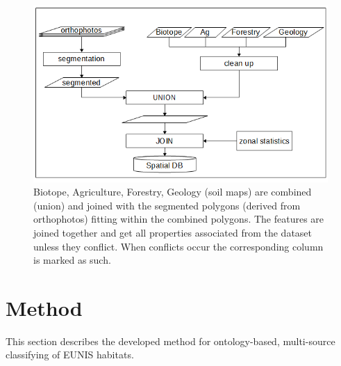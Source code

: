 \documentclass[authoryear, review,12pt,number]{elsarticle}
\begin{document}
\begin{figure} \includegraphics[width=1\textwidth]{diagrams/pre_processing.png}
    \caption{Biotope, Agriculture, Forestry, Geology (soil maps) are combined 
    (union) and joined with the segmented polygons (derived from orthophotos) 
    fitting within the combined polygons. The features are joined together 
    and get all properties associated from the dataset unless they conflict. 
    When conflicts occur the corresponding column is marked as such.}
\label{fig_pre-processing}
\end{figure}

\section{Method}
This section describes the developed method for ontology-based, multi-source
classifying of EUNIS habitats.
\label{subsec_method_overview}
\end{document}
